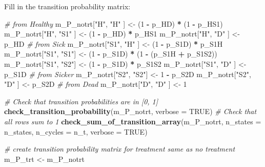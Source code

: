 \documentclass[
]{article}
\newenvironment{Shaded}{\begin{snugshade}}{\end{snugshade}}
\newcommand{\CommentTok}[1]{\textcolor[rgb]{0.56,0.35,0.01}{\textit{#1}}}
\newcommand{\DataTypeTok}[1]{\textcolor[rgb]{0.13,0.29,0.53}{#1}}
\newcommand{\DecValTok}[1]{\textcolor[rgb]{0.00,0.00,0.81}{#1}}
\newcommand{\KeywordTok}[1]{\textcolor[rgb]{0.13,0.29,0.53}{\textbf{#1}}}
\newcommand{\NormalTok}[1]{#1}
\newcommand{\OperatorTok}[1]{\textcolor[rgb]{0.81,0.36,0.00}{\textbf{#1}}}
\newcommand{\OtherTok}[1]{\textcolor[rgb]{0.56,0.35,0.01}{#1}}
\newcommand{\StringTok}[1]{\textcolor[rgb]{0.31,0.60,0.02}{#1}}
\begin{document}
Fill in the transition probability matrix:

\begin{Shaded}
\begin{Highlighting}[]
\CommentTok{# from Healthy}
\NormalTok{m_P_notrt[}\StringTok{"H"}\NormalTok{, }\StringTok{"H"}\NormalTok{  ] <-}\StringTok{ }\NormalTok{(}\DecValTok{1} \OperatorTok{-}\StringTok{ }\NormalTok{p_HD) }\OperatorTok{*}\StringTok{ }\NormalTok{(}\DecValTok{1} \OperatorTok{-}\StringTok{ }\NormalTok{p_HS1)}
\NormalTok{m_P_notrt[}\StringTok{"H"}\NormalTok{, }\StringTok{"S1"}\NormalTok{ ] <-}\StringTok{ }\NormalTok{(}\DecValTok{1} \OperatorTok{-}\StringTok{ }\NormalTok{p_HD) }\OperatorTok{*}\StringTok{ }\NormalTok{p_HS1}
\NormalTok{m_P_notrt[}\StringTok{"H"}\NormalTok{, }\StringTok{"D"}\NormalTok{  ] <-}\StringTok{ }\NormalTok{p_HD}
\CommentTok{# from Sick}
\NormalTok{m_P_notrt[}\StringTok{"S1"}\NormalTok{, }\StringTok{"H"}\NormalTok{ ] <-}\StringTok{ }\NormalTok{(}\DecValTok{1} \OperatorTok{-}\StringTok{ }\NormalTok{p_S1D) }\OperatorTok{*}\StringTok{ }\NormalTok{p_S1H}
\NormalTok{m_P_notrt[}\StringTok{"S1"}\NormalTok{, }\StringTok{"S1"}\NormalTok{] <-}\StringTok{ }\NormalTok{(}\DecValTok{1} \OperatorTok{-}\StringTok{ }\NormalTok{p_S1D) }\OperatorTok{*}\StringTok{ }\NormalTok{(}\DecValTok{1} \OperatorTok{-}\StringTok{ }\NormalTok{(p_S1H }\OperatorTok{+}\StringTok{ }\NormalTok{p_S1S2))}
\NormalTok{m_P_notrt[}\StringTok{"S1"}\NormalTok{, }\StringTok{"S2"}\NormalTok{] <-}\StringTok{ }\NormalTok{(}\DecValTok{1} \OperatorTok{-}\StringTok{ }\NormalTok{p_S1D) }\OperatorTok{*}\StringTok{ }\NormalTok{p_S1S2}
\NormalTok{m_P_notrt[}\StringTok{"S1"}\NormalTok{, }\StringTok{"D"}\NormalTok{ ] <-}\StringTok{ }\NormalTok{p_S1D}
\CommentTok{# from Sicker}
\NormalTok{m_P_notrt[}\StringTok{"S2"}\NormalTok{, }\StringTok{"S2"}\NormalTok{] <-}\StringTok{ }\DecValTok{1} \OperatorTok{-}\StringTok{ }\NormalTok{p_S2D}
\NormalTok{m_P_notrt[}\StringTok{"S2"}\NormalTok{, }\StringTok{"D"}\NormalTok{ ] <-}\StringTok{ }\NormalTok{p_S2D}
\CommentTok{# from Dead}
\NormalTok{m_P_notrt[}\StringTok{"D"}\NormalTok{, }\StringTok{"D"}\NormalTok{  ] <-}\StringTok{ }\DecValTok{1}

\CommentTok{# Check that transition probabilities are in [0, 1]}
\KeywordTok{check_transition_probability}\NormalTok{(m_P_notrt, }\DataTypeTok{verbose =} \OtherTok{TRUE}\NormalTok{)}
\CommentTok{# Check that all rows sum to 1}
\KeywordTok{check_sum_of_transition_array}\NormalTok{(m_P_notrt, }\DataTypeTok{n_states =}\NormalTok{ n_states, }\DataTypeTok{n_cycles =}\NormalTok{ n_t, }\DataTypeTok{verbose =} \OtherTok{TRUE}\NormalTok{)}

\CommentTok{# create transition probability matrix for treatment same as no treatment}
\NormalTok{m_P_trt <-}\StringTok{ }\NormalTok{m_P_notrt}
\end{Highlighting}
\end{Shaded}
\end{document}
